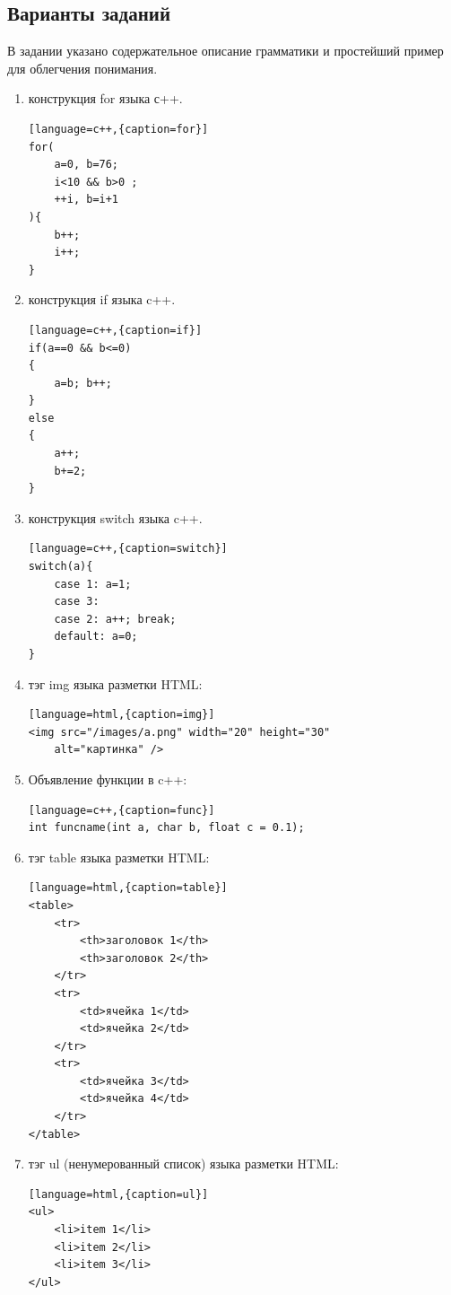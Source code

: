 \documentclass[a4paper,12pt]{article}
\begin{document}
\subsection{Варианты заданий}
В задании указано содержательное описание грамматики и простейший пример для облегчения понимания.
\begin{enumerate}
	\item конструкция for языка с++. 
\begin{lstlisting}[language=c++,{caption=for}]
for(
	a=0, b=76; 
	i<10 && b>0 ;
	++i, b=i+1
){ 
	b++;
	i++;
}
\end{lstlisting}

	\item конструкция if языка c++. 
\begin{lstlisting}[language=c++,{caption=if}]
if(a==0 && b<=0)
{
	a=b; b++;
}
else
{
	a++; 
	b+=2;
}
\end{lstlisting}

	\item конструкция switch языка c++. 
\begin{lstlisting}[language=c++,{caption=switch}]
switch(a){ 
	case 1: a=1; 
	case 3: 
	case 2: a++; break; 
	default: a=0;
}
\end{lstlisting}

	\item тэг img языка разметки HTML: 
\begin{lstlisting}[language=html,{caption=img}]
<img src="/images/a.png" width="20" height="30" 
	alt="картинка" />
\end{lstlisting}

	\item Объявление функции в c++:
\begin{lstlisting}[language=c++,{caption=func}]
int funcname(int a, char b, float c = 0.1);
\end{lstlisting}

	\item тэг table языка разметки HTML: 
\begin{lstlisting}[language=html,{caption=table}]
<table>
	<tr>
		<th>заголовок 1</th>
		<th>заголовок 2</th>
	</tr>
	<tr>
		<td>ячейка 1</td>
		<td>ячейка 2</td>
	</tr>
	<tr>
		<td>ячейка 3</td>
		<td>ячейка 4</td>
	</tr>
</table>
\end{lstlisting}

	\item тэг ul (ненумерованный список) языка разметки HTML: 
\begin{lstlisting}[language=html,{caption=ul}]
<ul>
	<li>item 1</li>
	<li>item 2</li>
	<li>item 3</li>
</ul>
\end{lstlisting}


\end{enumerate}
\end{document}
